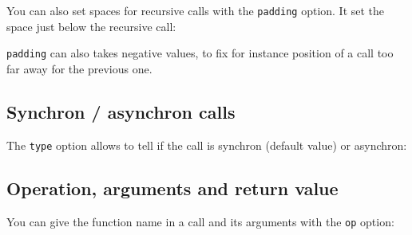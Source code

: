\documentclass[a4paper,11pt]{report}
\begin{document}
You can also set spaces for recursive calls with the {\tt padding} option. It set the space just below the recursive call:

\medskip

\begin{minipage}{0.5\textwidth}
	
\end{minipage}
\begin{minipage}{0.5\textwidth}
	\begin{center}
	\end{center}
\end{minipage}

\begin{remark}
	{\tt padding} can also takes negative values, to fix for instance position of a call too far away for the previous one.
\end{remark}

\subsection{Synchron / asynchron calls}\label{ss.callsync}

The {\tt type} option allows to tell if the call is synchron (default value) or asynchron:

\medskip

\begin{minipage}{0.5\textwidth}
	
\end{minipage}
\begin{minipage}{0.5\textwidth}
	\begin{center}
	\end{center}
\end{minipage}

\subsection{Operation, arguments and return value}\label{ss.callop}

You can give the function name in a call and its arguments with the {\tt op} option:

\medskip

\begin{minipage}{0.5\textwidth}
	
\end{minipage}
\begin{minipage}{0.5\textwidth}
	\begin{center}
	\end{center}
\end{minipage}
\end{document}
